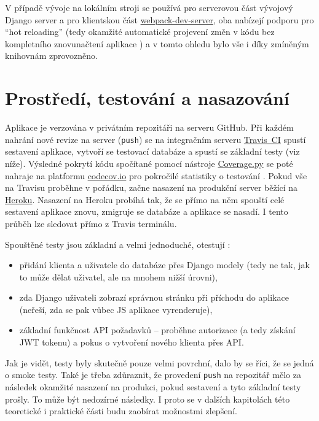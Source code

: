 V případě vývoje na lokálním stroji se používá \cite{bp} pro serverovou část vývojový Django server a pro klientskou část \href{https://github.com/webpack/webpack-dev-server}{webpack-dev-server}, oba nabízejí podporu pro \enquote{hot reloading} (tedy okamžité automatické projevení změn v kódu bez kompletního znovunačtení aplikace \cite{webpack-docs-hmr}) a v tomto ohledu bylo vše i díky zmíněným knihovnám zprovozněno.

\section{Prostředí, testování a nasazování}\label{sec:prostreditestovaninasazovani}

Aplikace \cite{bp} je verzována v privátním repozitáři na serveru GitHub. Při každém nahrání nové revize na server (\verb|push|) se na integračním serveru \href{https://travis-ci.com/}{Travis~CI} spustí sestavení aplikace, vytvoří se testovací databáze a spustí se základní testy (viz níže). Výsledné pokrytí kódu spočítané pomocí nástroje \href{https://coverage.readthedocs.io/}{Coverage.py} se poté nahraje na platformu \href{https://codecov.io/}{codecov.io} pro pokročilé statistiky o testování \cite{codecov}. Pokud vše na Travisu proběhne v pořádku, začne nasazení na produkční server běžící na \href{https://www.heroku.com/}{Heroku}. Nasazení na Heroku probíhá tak, že se přímo na něm spouští celé sestavení aplikace znovu, zmigruje se databáze a aplikace se nasadí. I tento průběh lze sledovat přímo z Travis terminálu.

Spouštěné testy jsou základní a velmi jednoduché, otestují \cite{bp}:
\begin{itemize}
    \item přidání klienta a uživatele do databáze přes Django modely (tedy ne tak, jak to může dělat uživatel, ale na mnohem nižší úrovni),
    \item zda Django uživateli zobrazí správnou stránku při příchodu do aplikace (neřeší, zda se pak vůbec JS aplikace vyrenderuje),
    \item základní funkčnost API požadavků -- proběhne autorizace (a tedy získání JWT tokenu) a pokus o vytvoření nového klienta přes API.
\end{itemize}

Jak je vidět, testy byly skutečně pouze velmi povrchní, dalo by se říci, že se jedná o smoke testy. Také je třeba zdůraznit, že provedení \verb|push| na repozitář mělo za následek okamžité nasazení na produkci, pokud sestavení a tyto základní testy prošly. To může být nedozírné následky. I proto se v dalších kapitolách této teoretické i praktické části budu zaobírat možnostmi zlepšení.

